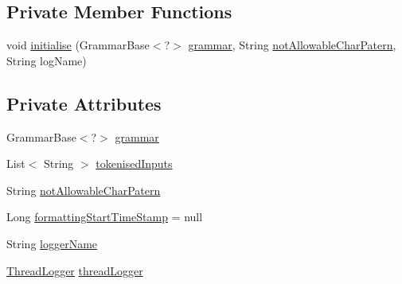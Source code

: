 \subsection*{Private Member Functions}
\begin{DoxyCompactItemize}
\item 
void \hyperlink{classit_1_1emarolab_1_1cagg_1_1core_1_1evaluation_1_1inputFormatting_1_1InputFormatterBase_ac841f886f945f934845d94fffbf2b582}{initialise} (Grammar\-Base$<$?$>$ \hyperlink{classit_1_1emarolab_1_1cagg_1_1core_1_1evaluation_1_1inputFormatting_1_1InputFormatterBase_a3de6c039296a18f821706f1b8e0cb2a5}{grammar}, String \hyperlink{classit_1_1emarolab_1_1cagg_1_1core_1_1evaluation_1_1inputFormatting_1_1InputFormatterBase_af8c1c79313632272c67711704784ef13}{not\-Allowable\-Char\-Patern}, String log\-Name)
\end{DoxyCompactItemize}
\subsection*{Private Attributes}
\begin{DoxyCompactItemize}
\item 
Grammar\-Base$<$?$>$ \hyperlink{classit_1_1emarolab_1_1cagg_1_1core_1_1evaluation_1_1inputFormatting_1_1InputFormatterBase_a3de6c039296a18f821706f1b8e0cb2a5}{grammar}
\item 
List$<$ String $>$ \hyperlink{classit_1_1emarolab_1_1cagg_1_1core_1_1evaluation_1_1inputFormatting_1_1InputFormatterBase_a65eb65d8bda12ec8dd823e6bc3b04c9a}{tokenised\-Inputs}
\item 
String \hyperlink{classit_1_1emarolab_1_1cagg_1_1core_1_1evaluation_1_1inputFormatting_1_1InputFormatterBase_af8c1c79313632272c67711704784ef13}{not\-Allowable\-Char\-Patern}
\item 
Long \hyperlink{classit_1_1emarolab_1_1cagg_1_1core_1_1evaluation_1_1inputFormatting_1_1InputFormatterBase_aea9730062293893aefe4e81c5e2ecedd}{formatting\-Start\-Time\-Stamp} = null
\item 
String \hyperlink{classit_1_1emarolab_1_1cagg_1_1core_1_1evaluation_1_1inputFormatting_1_1InputFormatterBase_a056ceacafad1bfa504e41694d410b6e7}{logger\-Name}
\item 
\hyperlink{classit_1_1emarolab_1_1cagg_1_1core_1_1evaluation_1_1CaggThread_1_1ThreadLogger}{Thread\-Logger} \hyperlink{classit_1_1emarolab_1_1cagg_1_1core_1_1evaluation_1_1inputFormatting_1_1InputFormatterBase_a68a63e17ad1b722964701fb2eccca7cf}{thread\-Logger}
\end{DoxyCompactItemize}


